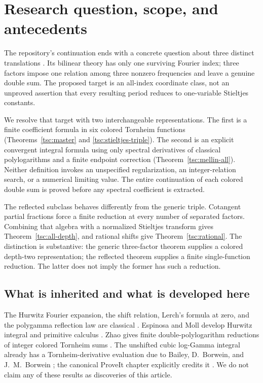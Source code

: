 \section{Research question, scope, and antecedents}\label{tsc:scope}
The repository's continuation
ends with a concrete question about three distinct translations
\cite{tsc:shj}. Its bilinear theory has only one surviving Fourier index;
three factors impose one relation among three nonzero frequencies and leave
a genuine double sum. The proposed target is an all-index coordinate class,
not an unproved assertion that every resulting period reduces to one-variable
Stieltjes constants.

We resolve that target with two interchangeable representations. The first
is a finite coefficient formula in six colored Tornheim functions
(Theorems~\ref{tsc:master} and \ref{tsc:stieltjes-triple}). The second is an
explicit convergent integral formula using only spectral derivatives of
classical polylogarithms and a finite endpoint correction
(Theorem~\ref{tsc:mellin-all}). Neither definition invokes an unspecified
regularization, an integer-relation search, or a numerical limiting value.
The entire continuation of each colored double sum is proved before any
spectral coefficient is extracted.

The reflected subclass behaves differently from the generic triple.
Cotangent partial fractions force a finite reduction at every number of
separated factors. Combining that algebra with a normalized Stieltjes
transform gives Theorem~\ref{tsc:all-depth}, and rational shifts give
Theorem~\ref{tsc:rational}. The distinction is substantive: the generic
three-factor theorem supplies a colored depth-two representation; the
reflected theorem supplies a finite single-function reduction. The latter
does not imply the former has such a reduction.

\subsection{What is inherited and what is developed here}
The Hurwitz Fourier expansion, the shift relation, Lerch's formula at zero,
and the polygamma reflection law are classical \cite{tsc:dlmf-zeta,tsc:dlmf-gamma}.
Espinosa and Moll develop Hurwitz integral and primitive calculus
\cite{tsc:em1,tsc:em2}. Zhao gives finite double-polylogarithm reductions of
integer colored Tornheim sums \cite{tsc:zhao}. The unshifted cubic
log-Gamma integral already has a Tornheim-derivative evaluation due to
Bailey, D.~Borwein, and J.~M.~Borwein \cite{tsc:bbb}; the canonical ProveIt
chapter explicitly credits it \cite{tsc:gamma-chapter}. We do not claim any
of these results as discoveries of this article.

